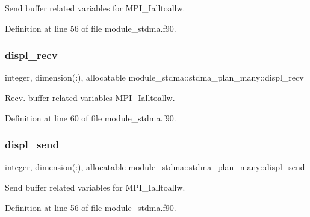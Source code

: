 Send buffer related variables for M\+P\+I\+\_\+\+Ialltoallw. 



Definition at line 56 of file module\+\_\+stdma.\+f90.

\mbox{\label{structmodule__stdma_1_1stdma__plan__many_ae60c70d406ef511431a335c9eb2f029c}} 
\subsubsection{\texorpdfstring{displ\_recv}{displ\_recv}}
{\footnotesize\ttfamily integer, dimension(\+:), allocatable module\+\_\+stdma\+::stdma\+\_\+plan\+\_\+many\+::displ\+\_\+recv}



Recv. buffer related variables M\+P\+I\+\_\+\+Ialltoallw. 



Definition at line 60 of file module\+\_\+stdma.\+f90.

\mbox{\label{structmodule__stdma_1_1stdma__plan__many_a78987f3bd9e87b612fa3d4a2ac85aa0a}} 
\subsubsection{\texorpdfstring{displ\_send}{displ\_send}}
{\footnotesize\ttfamily integer, dimension(\+:), allocatable module\+\_\+stdma\+::stdma\+\_\+plan\+\_\+many\+::displ\+\_\+send}



Send buffer related variables for M\+P\+I\+\_\+\+Ialltoallw. 



Definition at line 56 of file module\+\_\+stdma.\+f90.

\mbox{\label{structmodule__stdma_1_1stdma__plan__many_a4af0f905183855a4a3ae7caaf5e455c6}} 
